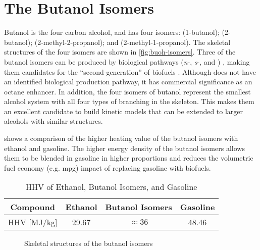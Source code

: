 \documentclass[12pt, letterpaper]{article}
\begin{document}
\section{The Butanol Isomers}
\label{sec:butanol-isomers}

Butanol is the four carbon alcohol, and has four isomers:
\nBuOH{} (1-butanol);
\sBuOH{} (2-butanol);
\tBuOH{} (2-methyl-2-propanol); and
\iBuOH{} (2-methyl-1-propanol).
The skeletal structures of the four isomers are shown in
\autoref{fig:buoh-isomers}. Three of the butanol isomers can be produced
by biological pathways (\textit{n}-, \textit{s}-, and \iBuOH{})
\cite{Nigam2011,Smith2010}, making them candidates for the ``second-generation''
of biofuels \cite{Harvey2011,Nigam2011}. Although \tBuOH{} does not have
an identified biological production pathway, it has commercial significance
as an octane enhancer. In addition, the four isomers of butanol represent
the smallest alcohol system with all four types of branching in the skeleton.
This makes them an excellent candidate to build kinetic models that can be
extended to larger alcohols with similar structures.

 shows a comparison of the higher heating value of
the butanol isomers with ethanol and gasoline. The higher energy density
of the butanol isomers allows them to be blended in gasoline in higher
proportions and reduces the volumetric fuel economy (e.g. mpg) impact
of replacing gasoline with biofuels.

\begin{table}
    \caption{HHV of Ethanol, Butanol Isomers, and Gasoline}
    \label{tab:buoh-heats}
    \begin{tabular}{*{4}{c}}
        \toprule
        Compound & Ethanol \cite{Afeefy2014} & Butanol Isomers \cite{Afeefy2014} & Gasoline \cite{Davis2013} \\
        \midrule
        HHV [\si[per-mode = symbol]{\mega\joule\per\kilo\gram}] & 29.67 & $\approx 36$ & 48.46 \\
        \bottomrule
    \end{tabular}
\end{table}

\begin{figure}
    {\caption{Skeletal structures of the butanol isomers}
    \label{fig:buoh-isomers}}
\end{figure}
\end{document}
